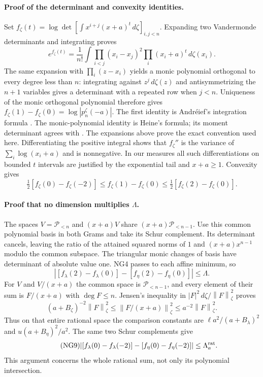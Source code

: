 \documentclass[11pt]{article}
\newcommand{\PP}{\mathcal P}\newcommand{\dd}{\,d}
\newcommand{\norm}[1]{\left\lVert#1\right\rVert}
\begin{document}
\paragraph{Proof of the determinant and convexity identities.}
Set $f_\zeta(t)=\log\det[\int x^{i+j}(x+a)^t\dd\zeta]_{i,j<n}$.
Expanding two Vandermonde determinants and integrating proves
\[
 e^{f_\zeta(t)}=\frac1{n!}\int\prod_{i<j}(x_i-x_j)^2
                              \prod_i(x_i+a)^t\dd\zeta(x_i).
\]
The same expansion with $\prod_i(z-x_i)$ yields a monic polynomial
orthogonal to every degree less than $n$: integrating against $z^j\dd\zeta(z)$
and antisymmetrizing the $n+1$ variables gives a determinant with a
repeated row when $j<n$. Uniqueness of the monic orthogonal polynomial
therefore gives
$f_\zeta(1)-f_\zeta(0)=\log|p_n^\zeta(-a)|$.
The first identity is Andr\'eief's integration formula
\cite[Eq.~(1.7) and Section~2.2]{forrester}. The monic-polynomial identity
is Heine's formula; its moment determinant agrees with
\cite[18.2.29]{dlmf}. The expansions above prove the exact convention used here.
Differentiating the positive integral shows that $f_\zeta''$ is the
variance of $\sum_i\log(x_i+a)$ and is nonnegative. In our measures
all such differentiations on bounded $t$ intervals are justified by the
exponential tail and $x+a\ge1$. Convexity gives
\begin{equation}\tag{NG7}
 \tfrac12[f_\zeta(0)-f_\zeta(-2)]
 \le f_\zeta(1)-f_\zeta(0)
 \le\tfrac12[f_\zeta(2)-f_\zeta(0)].
\end{equation}

\paragraph{Proof that no dimension multiplies $\Lambda$.}
The spaces $V=\PP_{<n}$ and $(x+a)V$ share
$(x+a)\PP_{<n-1}$. Use this common polynomial basis in both Grams
and take its Schur complement. Its determinant cancels, leaving the
ratio of the attained squared norms of $1$ and $(x+a)x^{n-1}$ modulo
the common subspace. The triangular monic changes of basis have
determinant of absolute value one. NG4 passes to each affine minimum,
so
\begin{equation}\tag{NG8}
 |[f_\lambda(2)-f_\lambda(0)]-[f_\eta(2)-f_\eta(0)]|\le\Lambda.
\end{equation}
For $V$ and $V/(x+a)$ the common space is $\PP_{<n-1}$, and every
element of their sum is $F/(x+a)$ with $\deg F\le n$. Jensen's inequality
in $|F|^2\dd\zeta/\norm F_\zeta^2$ proves
\[
 (a+B_\zeta)^{-2}\norm F_\zeta^2
 \le\norm{F/(x+a)}_\zeta^2\le a^{-2}\norm F_\zeta^2.
\]
Thus on that entire rational space the comparison constants are
$\ell a^2/(a+B_\lambda)^2$ and $u(a+B_\eta)^2/a^2$.
The same two Schur complements give
\begin{equation}\tag{NG9}
 |[f_\lambda(0)-f_\lambda(-2)]-[f_\eta(0)-f_\eta(-2)]|
 \le\Lambda_a^{\rm rat}.
\end{equation}
This argument concerns the whole rational sum, not only its polynomial
intersection.
\end{document}
